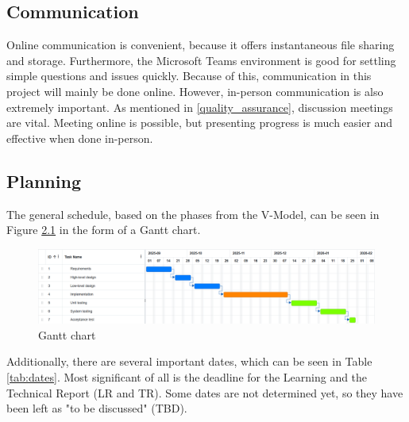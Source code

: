 \documentclass{report}
\begin{document}
	\section{Communication} \label{communication}
	Online communication is convenient, because it offers instantaneous file sharing and storage. Furthermore, the Microsoft Teams environment is good for settling simple questions and issues quickly. Because of this, communication in this project will mainly be done online. However, in-person communication is also extremely important. As mentioned in \ref{quality_assurance}, discussion meetings are vital. Meeting online is possible, but presenting progress is much easier and effective when done in-person.
	
	\begin{landscape}
		\chapter{Planning}\label{plan}
			The general schedule, based on the phases from the V-Model, can be seen in Figure \ref{fig:gantt} in the form of a Gantt chart.
		\begin{figure}[ht]
			\centering
			\includegraphics[width=1\linewidth]{img/gantt}
			\caption{Gantt chart}
			\label{fig:gantt}
		\end{figure}
		
		Additionally, there are several important dates, which can be seen in Table \ref{tab:dates}. Most significant of all is the deadline for the Learning and the Technical Report (LR and TR). Some dates are not determined yet, so they have been left as "to be discussed" (TBD). 
	
	\end{landscape}
\end{document}
